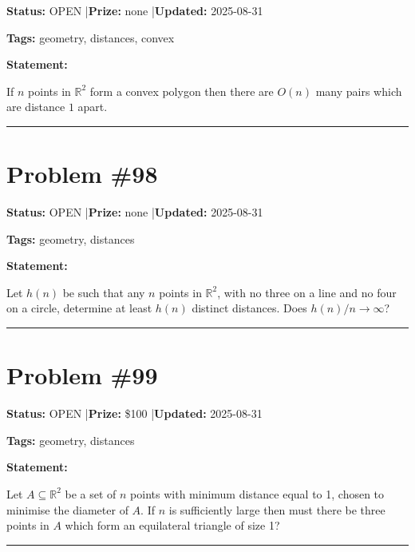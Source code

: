 \documentclass{article}
\begin{document}
\noindent\textbf{Status:} OPEN \quad|\quad \textbf{Prize:} none \quad|\quad \textbf{Updated:} 2025-08-31

\noindent\textbf{Tags:} geometry, distances, convex

\medskip

\noindent\textbf{Statement:}

If $n$ points in $\mathbb{R}^2$ form a convex polygon then there are $O(n)$ many pairs which are distance $1$ apart.

\noindent\rule{\linewidth}{0.4pt}


\section{Problem \#98}
\label{prob:98}

\noindent\textbf{Status:} OPEN \quad|\quad \textbf{Prize:} none \quad|\quad \textbf{Updated:} 2025-08-31

\noindent\textbf{Tags:} geometry, distances

\medskip

\noindent\textbf{Statement:}

Let $h(n)$ be such that any $n$ points in $\mathbb{R}^2$, with no three on a line and no four on a circle, determine at least $h(n)$ distinct distances. Does $h(n)/n\to \infty$?

\noindent\rule{\linewidth}{0.4pt}


\section{Problem \#99}
\label{prob:99}

\noindent\textbf{Status:} OPEN \quad|\quad \textbf{Prize:} \$100 \quad|\quad \textbf{Updated:} 2025-08-31

\noindent\textbf{Tags:} geometry, distances

\medskip

\noindent\textbf{Statement:}

Let $A\subseteq\mathbb{R}^2$ be a set of $n$ points with minimum distance equal to 1, chosen to minimise the diameter of $A$. If $n$ is sufficiently large then must there be three points in $A$ which form an equilateral triangle of size 1?

\noindent\rule{\linewidth}{0.4pt}


\end{document}
